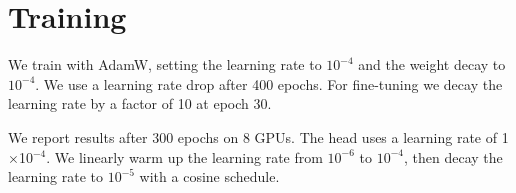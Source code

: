 \documentclass{article}
\begin{document}
\section{Training}

We train with AdamW, setting the learning rate to $10^{-4}$ and the weight
decay to $10^{-4}$. We use a learning rate drop after 400 epochs. For
fine-tuning we decay the learning rate by a factor of 10 at epoch 30.

We report results after 300 epochs on 8 GPUs. The head uses a learning rate
of 1$\times$10$^{-4}$. We linearly warm up the learning rate from $10^{-6}$ to
$10^{-4}$, then decay the learning rate to $10^{-5}$ with a cosine schedule.
\end{document}
